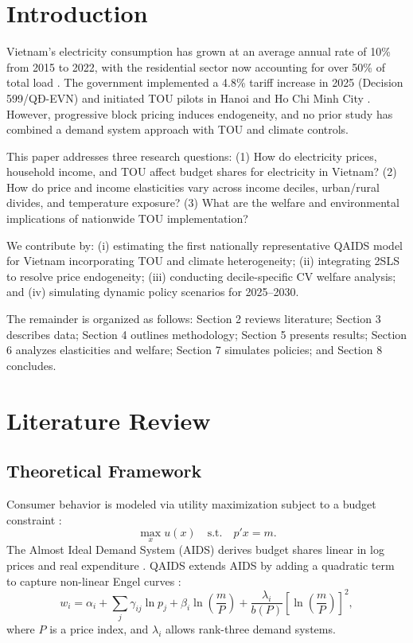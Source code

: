 \documentclass[12pt,a4paper]{article}
\begin{document}
	\clearpage
	
	\section{Introduction}
	Vietnam's electricity consumption has grown at an average annual rate of 10\% from 2015 to 2022, with the residential sector now accounting for over 50\% of total load \citep{gsovn2024}. The government implemented a 4.8\% tariff increase in 2025 (Decision 599/QĐ-EVN) and initiated TOU pilots in Hanoi and Ho Chi Minh City \citep{evn2025}. However, progressive block pricing induces endogeneity, and no prior study has combined a demand system approach with TOU and climate controls.
	
	This paper addresses three research questions:  
	(1) How do electricity prices, household income, and TOU affect budget shares for electricity in Vietnam?  
	(2) How do price and income elasticities vary across income deciles, urban/rural divides, and temperature exposure?  
	(3) What are the welfare and environmental implications of nationwide TOU implementation?
	
	We contribute by: (i) estimating the first nationally representative QAIDS model for Vietnam incorporating TOU and climate heterogeneity; (ii) integrating 2SLS to resolve price endogeneity; (iii) conducting decile-specific CV welfare analysis; and (iv) simulating dynamic policy scenarios for 2025--2030.
	
	The remainder is organized as follows: Section 2 reviews literature; Section 3 describes data; Section 4 outlines methodology; Section 5 presents results; Section 6 analyzes elasticities and welfare; Section 7 simulates policies; and Section 8 concludes.
	
	\section{Literature Review}
	
	\subsection{Theoretical Framework}
	Consumer behavior is modeled via utility maximization subject to a budget constraint \citep{varian1992}:
	\[
	\max_x u(x) \quad \text{s.t.} \quad p'x = m.
	\]
	The Almost Ideal Demand System (AIDS) derives budget shares linear in log prices and real expenditure \citep{deaton1980}. QAIDS extends AIDS by adding a quadratic term to capture non-linear Engel curves \citep{banks1997}:
	\[
	w_i = \alpha_i + \sum_j \gamma_{ij} \ln p_j + \beta_i \ln\left(\frac{m}{P}\right) + \frac{\lambda_i}{b(P)} \left[\ln\left(\frac{m}{P}\right)\right]^2,
	\]
	where $P$ is a price index, and $\lambda_i$ allows rank-three demand systems.
	
\end{document}
